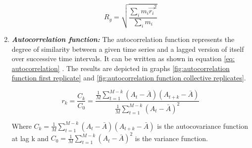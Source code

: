 \begin{enumerate}
    \begin{equation} \label{eq: radius of gyration}
        R_g = \sqrt{\frac{\sum_i{m_i \vec{r_i}^2}}{\sum_i{m_i}}}    
    \end{equation}


    \item \textit{\textbf{Autocorrelation function:}} The autocorrelation function represents the degree of similarity between a given time series and a lagged version of itself over successive time intervals. It can be written as shown in equation \ref{eq: autocorrelation}
    \cite{sumaElectricFieldDrivenTrappingPolyelectrolytes2018}. The results are depicted in graphs \ref{fig:autocorrelation function first replicate} and \ref{fig:autocorrelation function collective replicates}. 
    
    \begin{equation} \label{eq: autocorrelation}
      r_k = \frac{C_k}{C_0} = \frac{\frac{1}{M} \sum_{t = 1}^{M - k}{(A_t - \bar{A})(A_{t+k} - \bar{A})}}{\frac{1}{M} \sum_{t = 1}^{M - k}{(A_t - \bar{A})^2}}
    \end{equation}

    Where $C_k = \frac{1}{M} \sum_{t = 1}^{M - k}{(A_t - \bar{A})(A_{t+k} - \bar{A})}$ is the autocovariance function at lag k and $C_0 = \frac{1}{M} \sum_{t = 1}^{M - k}{(A_t - \bar{A})^2}$ is the variance function.
    
\end{enumerate}

